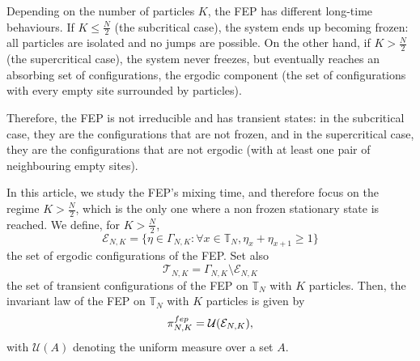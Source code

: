 \documentclass[11pt,a4paper]{article}
\newcommand{\T}{\mathbb{T}}
\newcommand{\FEP}{\textsc{fep}}
\newcommand{\eqs}[1]{\begin{equation}#1\end{equation}}
\begin{document}
Depending on the number of particles $K$, the FEP has different long-time behaviours. If $K \le \frac{N}{2}$ (the subcritical case), the system ends up becoming frozen: all particles are isolated and no jumps are possible. On the other hand, if $K > \frac{N}{2}$ (the supercritical case), the system never freezes, but eventually reaches an absorbing set of configurations, the ergodic component (the set of configurations with every empty site surrounded by particles). 

Therefore, the FEP is not irreducible and has transient states: in the subcritical case, they are the configurations that are not frozen, and in the supercritical case, they are the configurations that are not ergodic (with at least one pair of neighbouring empty sites). 

In this article, we study the FEP's mixing time, and therefore focus on the regime $K > \frac{N}{2}$, which is the only one where a non frozen stationary state is reached. We define, for $K > \frac{N}{2}$,
\eqs{\mathcal{E}_{N,K} = \{\eta \in \Gamma_{N,K} : \forall x \in \T_N, \eta_x + \eta_{x+1} \ge 1\}}
the set of ergodic configurations of the FEP. Set also 
\eqs{\mathcal{T}_{N,K} = \Gamma_{N,K} \setminus \mathcal{E}_{N,K}}
the set of transient configurations of the FEP on $\T_N$ with $K$ particles. 
Then, the invariant law of the FEP on $\T_N$ with $K$ particles is given by
\eqs{\pi_{N,K}^{\FEP} = \mathcal{U}(\mathcal{E}_{N,K}),}
with $\mathcal{U}(A)$ denoting the uniform measure over a set $A$.
\end{document}
